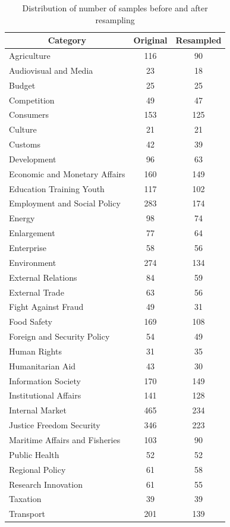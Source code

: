 \begin{table}[!ht]
\centering
\begin{tabular}{lcc}
\hline
\multicolumn{1}{c}{Category} & Original & Resampled \\ \hline
Agriculture & 116 & 90 \\
Audiovisual and Media & 23 & 18 \\
Budget & 25 & 25 \\
Competition & 49 & 47 \\
Consumers & 153 & 125 \\
Culture & 21 & 21 \\
Customs & 42 & 39 \\
Development & 96 & 63 \\
Economic and Monetary Affairs & 160 & 149 \\
Education Training Youth & 117 & 102 \\
Employment and Social Policy & 283 & 174 \\
Energy & 98 & 74 \\
Enlargement & 77 & 64 \\
Enterprise & 58 & 56 \\
Environment & 274 & 134 \\
External Relations & 84 & 59 \\
External Trade & 63 & 56 \\
Fight Against Fraud & 49 & 31 \\
Food Safety & 169 & 108 \\
Foreign and Security Policy & 54 & 49 \\
Human Rights & 31 & 35 \\
Humanitarian Aid & 43 & 30 \\
Information Society & 170 & 149 \\
Institutional Affairs & 141 & 128 \\
Internal Market & 465 & 234 \\
Justice Freedom Security & 346 & 223 \\
Maritime Affairs and Fisheries & 103 & 90 \\
Public Health & 52 & 52 \\
Regional Policy & 61 & 58 \\
Research Innovation & 61 & 55 \\
Taxation & 39 & 39 \\
Transport & 201 & 139 \\ \cline{1-3}
\end{tabular}
\captionsetup{justification=centering,margin=1cm}
\caption{Distribution of number of samples before and after resampling}
\label{table:befforeAfterResampling}
\end{table}
